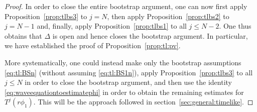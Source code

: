 \documentclass[11pt,english]{article}
\numberwithin{equation}{section}
\theoremstyle{remark}
\theoremstyle{plain}
\theoremstyle{remark}
\newcommand{\pv}{\partial_v}
\renewcommand{\(}{\left(}
\renewcommand{\)}{\right)}
\newcommand{\pho}{(r\phi_1)}
\begin{document}
\begin{proof}


In order to close the entire bootstrap argument, one can now first apply Proposition~\ref{prop:tlbs3} to $j=N$, then apply Proposition~\ref{prop:tlbs2} to $j=N-1$ and, finally, apply Proposition~\ref{prop:tlbs1} to all $j\leq N-2$. 
 One thus obtains that $\Delta$ is open and hence closes the bootstrap argument. In particular, we have established the proof of Proposition~\ref{prop:tl:pv}.

More systematically, one could instead make only the bootstrap assumptions \eqref{eq:tl:BSn} (without assuming \eqref{eq:tl:BS1n}), apply Proposition~\ref{prop:tlbs3} to all $j\leq N$ in order to close the bootstrap argument, and then use the identity \eqref{eq:waveequationtoestimatephi} in order to obtain the remaining estimates for $T^j(r\phi_1)$. This will be the approach followed in section~\ref{sec:general:timelike}.
\end{proof}
\end{document}
